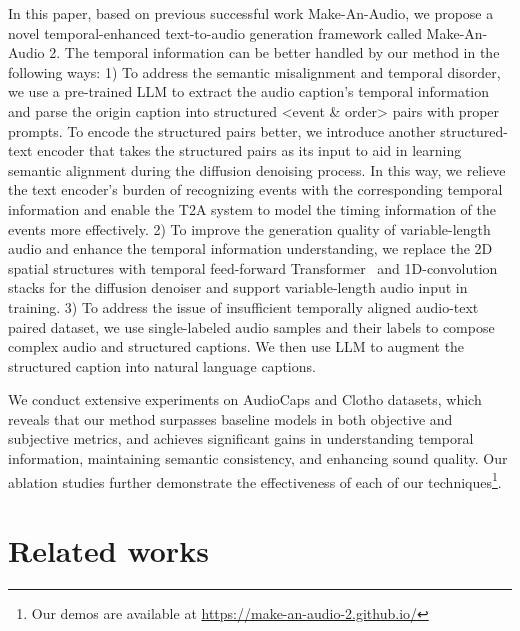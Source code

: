 \documentclass{article}
\begin{document}
In this paper, based on previous successful work Make-An-Audio, we propose a novel temporal-enhanced text-to-audio generation framework called Make-An-Audio 2. The temporal information can be better handled by our method in the following ways: 1) To address the semantic misalignment and temporal disorder, we use a pre-trained LLM to extract the audio caption's temporal information and parse the origin caption into structured <event \& order> pairs with proper prompts. To encode the structured pairs better, we introduce another structured-text encoder that takes the structured pairs as its input to aid in learning semantic alignment during the diffusion denoising process. In this way, we relieve the text encoder's burden of recognizing events with the corresponding temporal information and enable the T2A system to model the timing information of the events more effectively. 2) To improve the generation quality of variable-length audio and enhance the temporal information understanding, we replace the 2D spatial structures with temporal feed-forward Transformer~\cite{vaswani2017attention} and 1D-convolution stacks for the diffusion denoiser and support variable-length audio input in training. 3) To address the issue of insufficient temporally aligned audio-text paired dataset, we use single-labeled audio samples and their labels to compose complex audio and structured captions. We then use LLM to augment the structured caption into natural language captions. 

We conduct extensive experiments on AudioCaps and Clotho datasets, which reveals that our method surpasses baseline models in both objective and subjective metrics, and achieves significant gains in understanding temporal information, maintaining semantic consistency, and enhancing sound quality. Our ablation studies further demonstrate the effectiveness of each of our techniques\footnote{Our demos are available at \url{https://make-an-audio-2.github.io/}}.


 \section{Related works}
\end{document}
